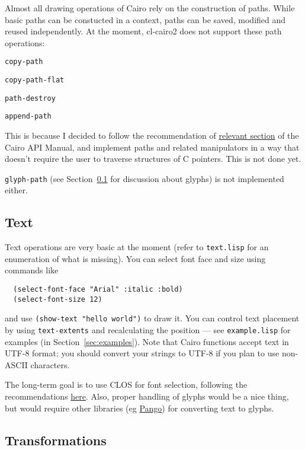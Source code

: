\documentclass[12pt,letterpaper]{article}
\begin{document}
Almost all drawing operations of Cairo rely on the construction of
paths.  While basic paths can be constucted in a context, paths can be
saved, modified and reused independently.  At the moment, cl-cairo2
does not support these path operations:
\begin{compactitem}
  \item\lstinline!copy-path!
  \item\lstinline!copy-path-flat!
  \item\lstinline!path-destroy!
  \item\lstinline!append-path!
\end{compactitem}
This is because I decided to follow the recommendation of
\href{http://www.cairographics.org/manual/bindings-path.html}{relevant
  section} of the Cairo API Manual, and implement paths and related
manipulators in a way that doesn't require the user to traverse
structures of C pointers.  This is not done yet.

\lstinline!glyph-path! (see Section~\ref{sec:text} for discussion
about glyphs) is not implemented either.

\subsection{Text}
\label{sec:text}

Text operations are very basic at the moment (refer to
\verb!text.lisp! for an enumeration of what is missing).  You can
select font face and size using commands like
\begin{lstlisting}
  (select-font-face "Arial" :italic :bold)
  (select-font-size 12)
\end{lstlisting}
and use \lstinline!(show-text "hello world")! to draw it.  You can
control text placement by using \lstinline!text-extents! and
recalculating the position --- see \verb!example.lisp! for examples
(in Section~\ref{sec:examples}).  Note that Cairo functions accept
text in UTF-8 format: you should convert your strings to UTF-8 if you
plan to use non-ASCII characters.

The long-term goal is to use CLOS for font selection, following the
recommendations
\href{http://www.cairographics.org/manual/bindings-fonts.html}{here}.
Also, proper handling of glyphs would be a nice thing, but would
require other libraries (eg \href{http://www.pango.org/}{Pango}) for
converting text to glyphs.

\subsection{Transformations}
\label{sec:transformations}
\end{document}
